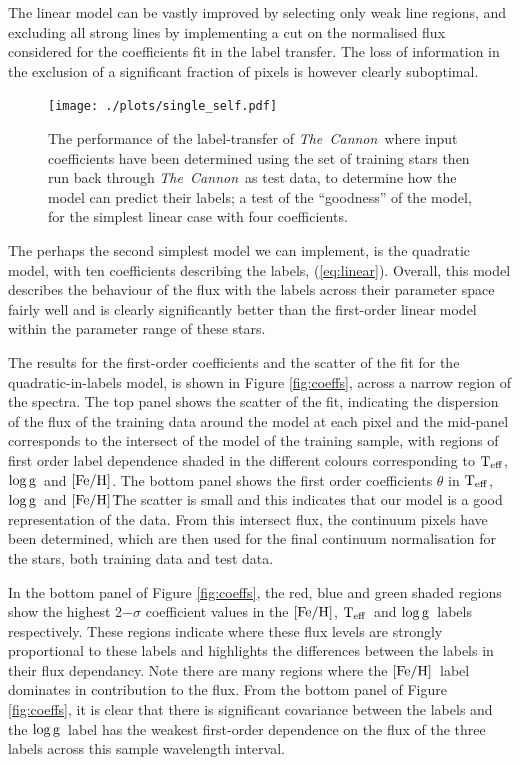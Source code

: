 \documentclass[12pt, preprint]{aastex}
\newcommand{\teff}{\mbox{$\rm T_{eff}$}}
\newcommand{\feh}{\mbox{$\rm [Fe/H]$}}
\newcommand{\logg}{\mbox{$\rm \log g$}}
\newcommand{\tc}{\textsl{The~Cannon}}
\begin{document}
The linear model can be vastly improved by selecting only weak line regions, and excluding all strong lines by implementing a cut on the normalised flux considered for the coefficients fit in the label transfer. The loss of information in the exclusion of a significant fraction of pixels is however clearly suboptimal. 

\begin{figure}[h!]
\centering
  \texttt{[image: ./plots/single\_self.pdf]}
\caption{The performance of the label-transfer of \tc\, where input coefficients have been determined using the set of training stars then run back through \tc\ as test data, to determine how the model can predict their labels; a test of the ``goodness'' of the model, for the simplest linear case with four coefficients. }
\label{fig:self1}
\end{figure}

The perhaps the second simplest model we can implement, is the quadratic model, with ten coefficients describing the labels, (\ref{eq:linear}).  Overall, this model describes the behaviour of the flux with the labels across their parameter space fairly well and is clearly significantly better than the first-order linear model within the parameter range of these stars. 

The results for the first-order coefficients and the scatter of the fit for the quadratic-in-labels model, is shown in Figure \ref{fig:coeffs}, across a narrow region of the spectra. The top panel shows the scatter of the fit, indicating the dispersion of the flux of the training data around the model at each pixel and the mid-panel corresponds to the intersect of the model of the training sample, with regions of first order label dependence shaded in the different colours corresponding to \teff, \logg\ and \feh. The bottom panel shows the first order coefficients $\theta$ in \teff, \logg\ and \feh\.  The scatter is small and this indicates that our model is a good representation of the data. From this intersect flux, the continuum pixels have been determined, which  are then used for the final continuum normalisation for the stars, both training data and test data. 

 In the bottom panel of Figure \ref{fig:coeffs}, the red, blue and green shaded regions show the highest 2$-\sigma$ coefficient values in the \feh, \teff\ and \logg\ labels respectively. These regions indicate where these flux levels are strongly proportional to these labels and highlights the differences between the labels in their flux dependancy. Note there are many regions where the \feh\ label dominates in contribution to the flux. From the bottom panel of Figure \ref{fig:coeffs}, it is clear that there is significant covariance between the labels and the \logg\ label has the weakest first-order dependence on the flux of the three labels across this sample wavelength interval. 
\end{document}
